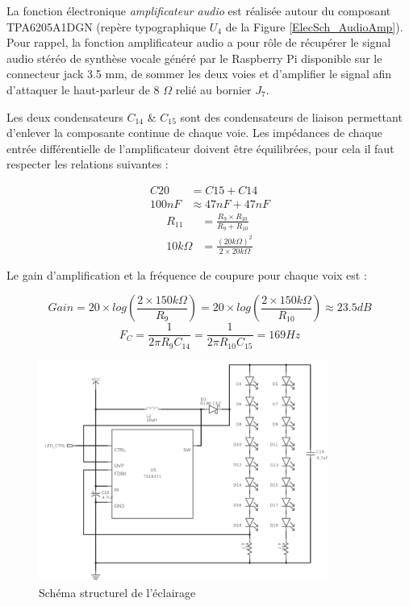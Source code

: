    La fonction électronique \emph{amplificateur audio} est réalisée autour du composant TPA6205A1DGN (repère typographique $U_4$ de la Figure \ref{ElecSch_AudioAmp}).
    Pour rappel, la fonction amplificateur audio a pour rôle de récupérer le signal audio stéréo de synthèse vocale généré par le Raspberry Pi disponible sur le connecteur jack 3.5 mm, de sommer les deux voies et d'amplifier le signal afin d'attaquer le haut-parleur de 8 $\Omega$ relié au bornier $J_7$.
    
    Les deux condensateurs $C_{14}$ \& $C_{15}$ sont des condensateurs de liaison permettant d'enlever la composante continue de chaque voie.
    Les impédances de chaque entrée différentielle de l'amplificateur doivent être équilibrées, pour cela il faut respecter les relations suivantes :
    
\begin{subequations}
\begin{align}
C20 &= C15 + C14 \\
100nF &\approx 47 nF + 47 nF
\end{align}
\end{subequations}
\begin{subequations}
\begin{align}
R_{11} &= \frac{R_9 \times R_{10}}{R_9 + R_{10}}\\
10 k\Omega &= \frac{(20 k\Omega)^{2}}{2 \times 20 k\Omega}
\end{align}
\end{subequations}
    
    Le gain d'amplification et la fréquence de coupure pour chaque voix est :
    
\begin{equation}
Gain = 20 \times log \left (\frac{2 \times 150 k\Omega}{R_9}\right ) = 20 \times log \left (\frac{2 \times 150 k\Omega}{R_{10}}\right ) \approx 23.5 dB
\end{equation}
\begin{equation}
F_{C} = \frac{1}{2 \pi R_9 C_{14}} = \frac{1}{2 \pi R_{10} C_{15}} = 169 Hz
\end{equation}

\begin{figure}[H]
    \centerline{
        \includegraphics[width=0.85\textwidth,fbox]{img/ElecSch_LedDriver}
    }
    \caption{Schéma structurel de l'éclairage}
    \label{ElecSch_LedDriver}
\end{figure}


